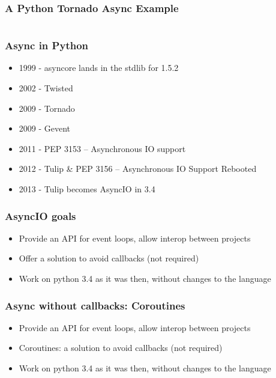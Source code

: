 \documentclass{beamer}
\begin{document}
\begin{frame}[fragile]
  \frametitle{A Python Tornado Async Example}
  \inputminted[fontsize=\footnotesize]{python}{code/tornado1.py}
\end{frame}

\begin{frame}
  \frametitle{Async in Python}
  \begin{itemize}
    \item 1999 - asyncore lands in the stdlib for 1.5.2
    \item 2002 - Twisted
    \item 2009 - Tornado
    \item 2009 - Gevent
    \item 2011 - PEP 3153 -- Asynchronous IO support
    \item 2012 - Tulip \& PEP 3156 -- Asynchronous IO Support Rebooted
    \item 2013 - Tulip becomes AsyncIO in 3.4
  \end{itemize}
\end{frame}

\begin{frame}
  \frametitle{AsyncIO goals}
  \begin{itemize}
    \item Provide an API for event loops, allow interop between projects
    \item Offer a solution to avoid callbacks (not required)
    \item Work on python 3.4 as it was then, without changes to the language
  \end{itemize}
\end{frame}

\begin{frame}
  \frametitle{Async without callbacks: Coroutines}
  \begin{itemize}
    \item Provide an API for event loops, allow interop between projects
    \item Coroutines: a solution to avoid callbacks (not required)
    \item Work on python 3.4 as it was then, without changes to the language
  \end{itemize}
\end{frame}
\end{document}
